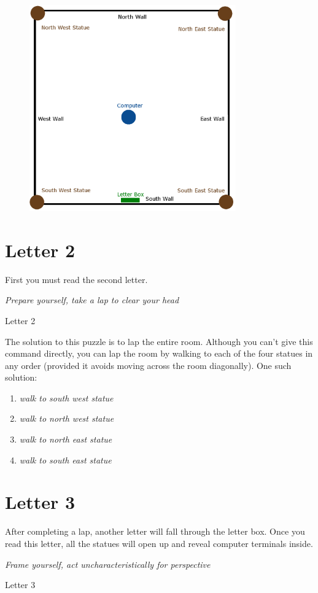 \documentclass{article}
\begin{document}
\begin{figure}[htb]
	\centering
	\includegraphics[width=3.5in]{RoomLayout2.png}
\end{figure}

\section*{Letter 2}
First you must read the second letter.

\epigraph{\textit{Prepare yourself, take a lap to clear your head}}{Letter 2}

The solution to this puzzle is to lap the entire room.
Although you can't give this command directly, you can lap the room by walking to each of the four statues in any order (provided it avoids moving across the room diagonally).
One such solution:

\begin{enumerate}
	\item \textit{walk to south west statue}
	\item \textit{walk to north west statue}
	\item \textit{walk to north east statue}
	\item \textit{walk to south east statue}
\end{enumerate}

\section*{Letter 3}
After completing a lap, another letter will fall through the letter box.
Once you read this letter, all the statues will open up and reveal computer terminals inside.

\epigraph{\textit{Frame yourself, act uncharacteristically for perspective}}{Letter 3}
\end{document}
